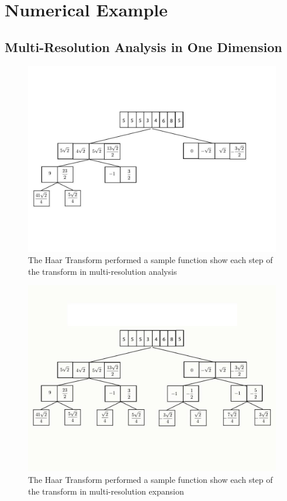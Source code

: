 \section {Numerical Example}
\subsection {Multi-Resolution Analysis in One Dimension}

\begin{figure}
\includegraphics [width=7in]{mraexample.jpg}
\caption{The Haar Transform performed a sample function show each step of the transform in multi-resolution analysis }
\label{nummra}
\end{figure}

\begin{figure}
\includegraphics [width=7in]{numexample01.jpg}
\caption{The Haar Transform performed a sample function show each step of the transform in multi-resolution expansion }
\label{nummre}
\end{figure}

